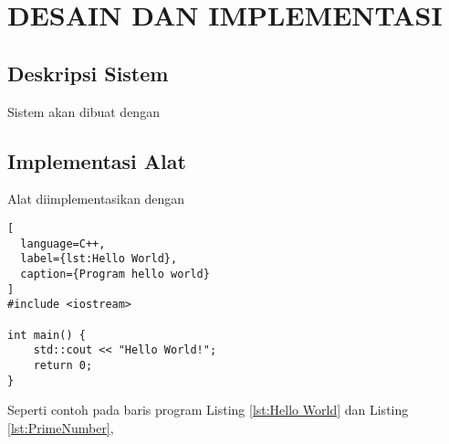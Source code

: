 \chapter{DESAIN DAN IMPLEMENTASI}


\section{Deskripsi Sistem}

Sistem akan dibuat dengan \lipsum[21][1-12]

\section{Implementasi Alat}

Alat diimplementasikan dengan \lipsum[22]

\begin{lstlisting}[
  language=C++,
  label={lst:Hello World},
  caption={Program hello world}
]
#include <iostream>

int main() {
    std::cout << "Hello World!";
    return 0;
}
\end{lstlisting}

Seperti contoh pada baris program Listing \ref{lst:Hello World} dan Listing \ref{lst:PrimeNumber}, \lipsum[23]


